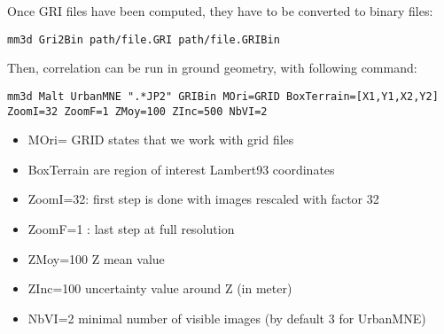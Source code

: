 Once GRI files have been computed, they have to be converted to binary files:
\begin{verbatim}
mm3d Gri2Bin path/file.GRI path/file.GRIBin
\end{verbatim}

Then, correlation can be run in ground geometry, with following command:

\begin{verbatim}
mm3d Malt UrbanMNE ".*JP2" GRIBin MOri=GRID BoxTerrain=[X1,Y1,X2,Y2]
ZoomI=32 ZoomF=1 ZMoy=100 ZInc=500 NbVI=2
\end{verbatim}

\begin{itemize}
 \item MOri= GRID states that we work with grid files
 \item   BoxTerrain are region of interest Lambert93 coordinates
 \item   ZoomI=32: first step is done with images rescaled with factor 32
 \item   ZoomF=1 : last step at full resolution
 \item   ZMoy=100  Z mean value 
 \item   ZInc=100 uncertainty value around Z (in meter)
 \item   NbVI=2 minimal number of visible images  (by default 3 for UrbanMNE)
\end{itemize}
  
